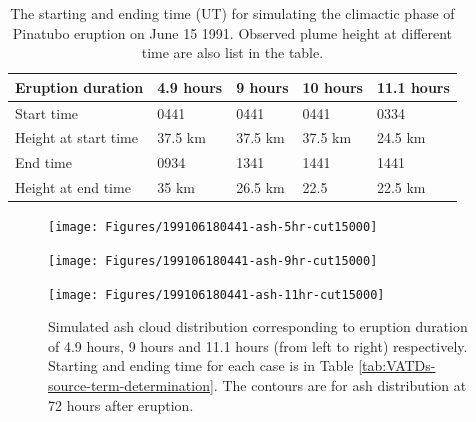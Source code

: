 \documentclass[draft,linenumbers]{agujournal2019}
\begin{document}
\begin{table}[htp]
\centering
      \caption{The starting and ending time (UT) for simulating the climactic phase of Pinatubo eruption on June 15 1991. Observed plume height \citep{holasek1996satellite} at different time are also list in the table.}		
	  \begin{tabular}{p{35mm}p{20mm}p{20mm}p{20mm}p{20mm}}
	    \hline
        Eruption duration & 4.9 hours & 9 hours & 10 hours & 11.1 hours \\
	    \hline
	    Start time & 0441 & 0441 & 0441 & 0334 \\
	    Height at start time & 37.5 km & 37.5 km  & 37.5 km  & 24.5 km \\
	    
	    End time   & 0934 & 1341 & 1441 & 1441  \\
	    	Height at end time & 35 km & 26.5 km & 22.5 & 22.5 km \\
	    \hline
	  \end{tabular}
	  \label{tab:Pinatubo-eruption-duration}
\end{table}

\begin{figure}[!htb]
    \centering
    \begin{minipage}{.325\textwidth}
        \centering
        \texttt{[image: Figures/199106180441-ash-5hr-cut15000]}
    \end{minipage}%
    \begin{minipage}{.325 \textwidth}
        \centering
        \texttt{[image: Figures/199106180441-ash-9hr-cut15000]}
    \end{minipage}%
    \begin{minipage}{.325 \textwidth}
        \centering
        \texttt{[image: Figures/199106180441-ash-11hr-cut15000]}
    \end{minipage}%
    \caption{Simulated ash cloud distribution corresponding to eruption duration of 4.9 hours, 9 hours and 11.1 hours (from left to right) respectively. Starting and ending time for each case is in Table \ref{tab:VATDs-source-term-determination}. The contours are for ash distribution at 72 hours after eruption.}
    \label{fig:Puff-sensitivity-duration}
\end{figure}
\end{document}
